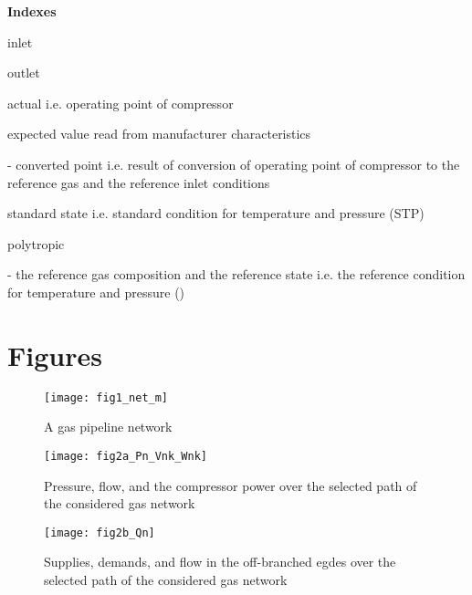 \documentclass{article}
\begin{document}
\bigskip

\textbf{Indexes}

 inlet

 outlet

 actual i.e. operating point of compressor

 expected value read from manufacturer characteristics

 - converted point i.e. result of conversion of operating point of
compressor to the reference gas and the reference inlet conditions

 standard state i.e. standard condition for temperature and pressure
(STP)

 polytropic

 - the reference gas composition and the reference state i.e. the
reference condition for temperature and pressure ()

\bigskip


\bigskip

\newpage

\section{Figures}





\begin{figure}[tbp]
\hspace{10cm} \centering
\texttt{[image: fig1\_net\_m]}\newline
\caption{A gas pipeline network}
\label{fig:1}
\end{figure}
\bigskip

\bigskip

\begin{figure}[tbp]
\hspace{10cm} \centering
\texttt{[image: fig2a\_Pn\_Vnk\_Wnk]}\newline
\caption{Pressure, flow, and the compressor power over the selected path of
the considered gas network }
\label{fig:2a}
\end{figure}
\bigskip

\bigskip

\begin{figure}[tbp]
\hspace{10cm} \centering\texttt{[image: fig2b\_Qn]}\newline
\caption{Supplies, demands, and flow in the off-branched egdes over the
selected path of the considered gas network }
\label{fig:2b}
\end{figure}
\end{document}
